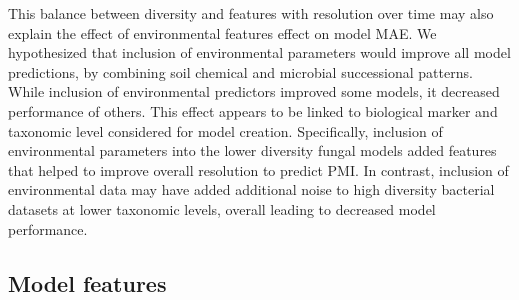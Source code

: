 \documentclass[
  10pt,
  letterpaper,
]{article}
\begin{document}
This balance between diversity and features with resolution over time
may also explain the effect of environmental features effect on model
MAE. We hypothesized that inclusion of environmental parameters would
improve all model predictions, by combining soil chemical and microbial
successional patterns. While inclusion of environmental predictors
improved some models, it decreased performance of others. This effect
appears to be linked to biological marker and taxonomic level considered
for model creation. Specifically, inclusion of environmental parameters
into the lower diversity fungal models added features that helped to
improve overall resolution to predict PMI. In contrast, inclusion of
environmental data may have added additional noise to high diversity
bacterial datasets at lower taxonomic levels, overall leading to
decreased model performance.

\hypertarget{model-features}{%
\subsection{Model features}\label{model-features}}
\end{document}
